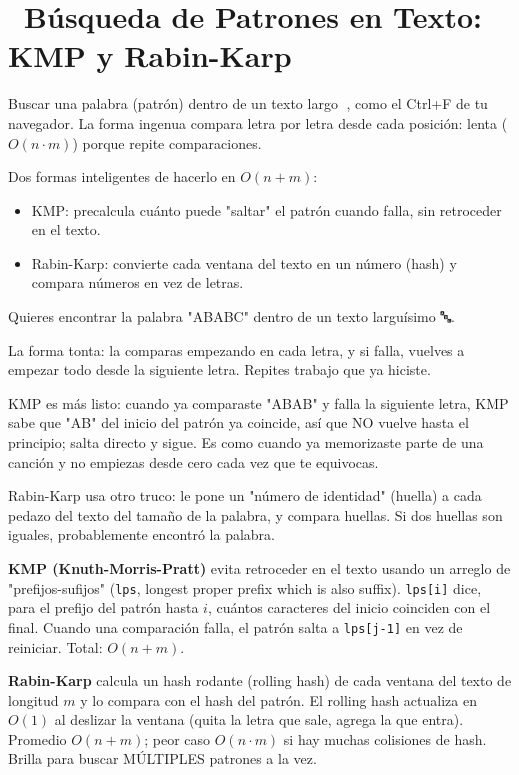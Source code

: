 \chapter[\emj{🔎}~Búsqueda de Patrones: KMP y Rabin-Karp]{~Búsqueda de Patrones en Texto: KMP y Rabin-Karp}

\begin{dsaquees}

Buscar una palabra (patrón) dentro de un texto largo 📃, como el
Ctrl+F de tu navegador. La forma ingenua compara letra por letra desde
cada posición: lenta ($O(n \cdot m)$) porque repite comparaciones.

Dos formas inteligentes de hacerlo en $O(n + m)$:
\begin{itemize}
\item KMP: precalcula cuánto puede "saltar" el patrón cuando falla, sin
      retroceder en el texto.
\item Rabin-Karp: convierte cada ventana del texto en un número (hash) y
      compara números en vez de letras.
\end{itemize}

\end{dsaquees}

\begin{dsanino}

Quieres encontrar la palabra "ABABC" dentro de un texto larguísimo 🔤.

La forma tonta: la comparas empezando en cada letra, y si falla, vuelves
a empezar todo desde la siguiente letra. Repites trabajo que ya hiciste.

KMP es más listo: cuando ya comparaste "ABAB" y falla la siguiente letra,
KMP sabe que "AB" del inicio del patrón ya coincide, así que NO vuelve
hasta el principio; salta directo y sigue. Es como cuando ya memorizaste
parte de una canción y no empiezas desde cero cada vez que te equivocas.

Rabin-Karp usa otro truco: le pone un "número de identidad" (huella) a
cada pedazo del texto del tamaño de la palabra, y compara huellas. Si dos
huellas son iguales, probablemente encontró la palabra.

\end{dsanino}

\begin{dsaotraforma}

\textbf{KMP (Knuth-Morris-Pratt)} evita retroceder en el texto usando un
arreglo de "prefijos-sufijos" (\verb|lps|, longest proper prefix which is
also suffix). \verb|lps[i]| dice, para el prefijo del patrón hasta $i$,
cuántos caracteres del inicio coinciden con el final. Cuando una
comparación falla, el patrón salta a \verb|lps[j-1]| en vez de reiniciar.
Total: $O(n + m)$.

\textbf{Rabin-Karp} calcula un hash rodante (rolling hash) de cada
ventana del texto de longitud $m$ y lo compara con el hash del patrón.
El rolling hash actualiza en $O(1)$ al deslizar la ventana (quita la
letra que sale, agrega la que entra). Promedio $O(n + m)$; peor caso
$O(n \cdot m)$ si hay muchas colisiones de hash. Brilla para buscar
MÚLTIPLES patrones a la vez.

\end{dsaotraforma}


